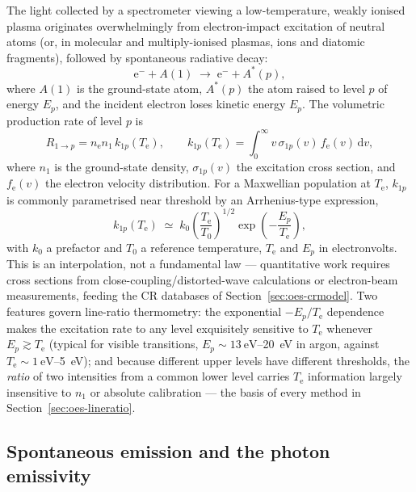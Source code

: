 The light collected by a spectrometer viewing a low-temperature, weakly ionised plasma originates overwhelmingly from electron-impact excitation of neutral atoms (or, in molecular and multiply-ionised plasmas, ions and diatomic fragments), followed by spontaneous radiative decay:
\begin{equation}
\mathrm{e}^{-} + A(1) \;\longrightarrow\; \mathrm{e}^{-} + A^{*}(p),
\label{eq:oes-exc}
\end{equation}
where $A(1)$ is the ground-state atom, $A^{*}(p)$ the atom raised to level $p$ of energy $E_{p}$, and the incident electron loses kinetic energy $E_{p}$. The volumetric production rate of level $p$ is
\begin{equation}
R_{1\to p} = n_{\mathrm{e}} n_{1} \, k_{1p}(T_{\mathrm{e}}),
\qquad
k_{1p}(T_{\mathrm{e}}) = \int_{0}^{\infty} v\, \sigma_{1p}(v)\, f_{\mathrm{e}}(v)\, \mathrm{d}v,
\label{eq:oes-rate}
\end{equation}
where $n_{1}$ is the ground-state density, $\sigma_{1p}(v)$ the excitation cross section, and $f_{\mathrm{e}}(v)$ the electron velocity distribution. For a Maxwellian population at $T_{\mathrm{e}}$, $k_{1p}$ is commonly parametrised near threshold by an Arrhenius-type expression,
\begin{equation}
k_{1p}(T_{\mathrm{e}}) \;\simeq\; k_{0}\left(\frac{T_{\mathrm{e}}}{T_{0}}\right)^{1/2} \exp\!\left(-\frac{E_{p}}{T_{\mathrm{e}}}\right),
\label{eq:oes-arrhenius}
\end{equation}
with $k_{0}$ a prefactor and $T_{0}$ a reference temperature, $T_{\mathrm{e}}$ and $E_{p}$ in electronvolts. This is an interpolation, not a fundamental law — quantitative work requires cross sections from close-coupling/distorted-wave calculations or electron-beam measurements, feeding the CR databases of Section~\ref{sec:oes-crmodel}. Two features govern line-ratio thermometry: the exponential $-E_{p}/T_{\mathrm{e}}$ dependence makes the excitation rate to any level exquisitely sensitive to $T_{\mathrm{e}}$ whenever $E_{p}\gtrsim T_{\mathrm{e}}$ (typical for visible transitions, $E_{p}\sim\SI{13}{\eV}$–\SI{20}{\eV} in argon, against $T_{\mathrm{e}}\sim\SI{1}{\eV}$–\SI{5}{\eV}); and because different upper levels have different thresholds, the \emph{ratio} of two intensities from a common lower level carries $T_{\mathrm{e}}$ information largely insensitive to $n_{1}$ or absolute calibration — the basis of every method in Section~\ref{sec:oes-lineratio}.

\subsection{Spontaneous emission and the photon emissivity}

